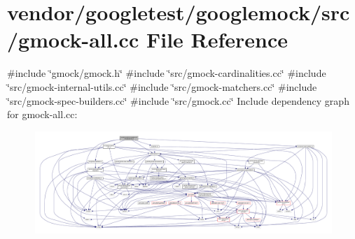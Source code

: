\hypertarget{gmock-all_8cc}{}\section{vendor/googletest/googlemock/src/gmock-\/all.cc File Reference}
\label{gmock-all_8cc}
{\ttfamily \#include \char`\"{}gmock/gmock.\+h\char`\"{}}\newline
{\ttfamily \#include \char`\"{}src/gmock-\/cardinalities.\+cc\char`\"{}}\newline
{\ttfamily \#include \char`\"{}src/gmock-\/internal-\/utils.\+cc\char`\"{}}\newline
{\ttfamily \#include \char`\"{}src/gmock-\/matchers.\+cc\char`\"{}}\newline
{\ttfamily \#include \char`\"{}src/gmock-\/spec-\/builders.\+cc\char`\"{}}\newline
{\ttfamily \#include \char`\"{}src/gmock.\+cc\char`\"{}}\newline
Include dependency graph for gmock-\/all.cc\+:
\nopagebreak
\begin{figure}[H]
\begin{center}
\leavevmode
\includegraphics[width=350pt]{gmock-all_8cc__incl}
\end{center}
\end{figure}

